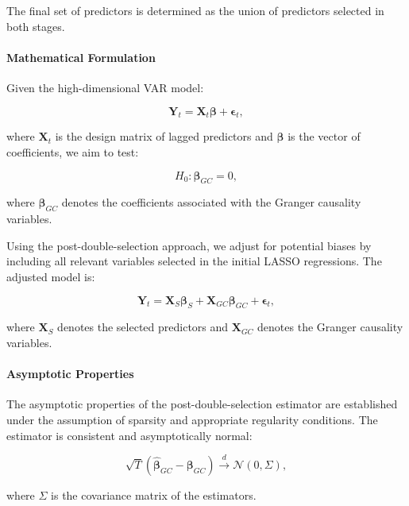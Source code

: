 \documentclass[11pt]{article}
\begin{document}
The final set of predictors is determined as the union of predictors selected in both stages.

\paragraph{Mathematical Formulation}

Given the high-dimensional VAR model:

\begin{equation}
\mathbf{Y}_t = \mathbf{X}_t \boldsymbol{\beta} + \boldsymbol{\epsilon}_t,
\end{equation}

where \(\mathbf{X}_t\) is the design matrix of lagged predictors and \(\boldsymbol{\beta}\) is the vector of coefficients, we aim to test:

\begin{equation}
H_0: \boldsymbol{\beta}_{GC} = 0,
\end{equation}

where \(\boldsymbol{\beta}_{GC}\) denotes the coefficients associated with the Granger causality variables.

Using the post-double-selection approach, we adjust for potential biases by including all relevant variables selected in the initial LASSO regressions. The adjusted model is:

\begin{equation}
\mathbf{Y}_t = \mathbf{X}_{S} \boldsymbol{\beta}_{S} + \mathbf{X}_{GC} \boldsymbol{\beta}_{GC} + \boldsymbol{\epsilon}_t,
\end{equation}

where \(\mathbf{X}_{S}\) denotes the selected predictors and \(\mathbf{X}_{GC}\) denotes the Granger causality variables.

\paragraph{Asymptotic Properties}

The asymptotic properties of the post-double-selection estimator are established under the assumption of sparsity and appropriate regularity conditions. The estimator is consistent and asymptotically normal:

\begin{equation}
\sqrt{T} (\hat{\boldsymbol{\beta}}_{GC} - \boldsymbol{\beta}_{GC}) \xrightarrow{d} \mathcal{N}(0, \Sigma),
\end{equation}

where \(\Sigma\) is the covariance matrix of the estimators.
\end{document}
